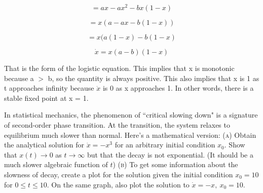 \documentclass[11pt,answers]{exam}
\begin{document}
\begin{questions}
\begin{solution}
$$ = ax - ax^2 - bx(1-x)$$

$$ = x(a-ax-b(1-x))$$

$$ = x(a(1-x)-b(1-x)$$

$$ \dot{x}= x(a-b)(1-x)$$

That is the form of the logistic equation. This implies that x is monotonic because a $>$ b, so the quantity is always positive. This also implies that x is 1 as t approaches infinity because $\dot{x}$ is 0 as x approaches 1. In other words, there is a stable fixed point at x = 1.

\end{solution}

\item In statistical mechanics, the phenomenon of ``critical slowing down" is a signature of second-order phase transition.  At the transition, the system relaxes to equilibrium much slower than normal.  Here's a mathematical version:
\newline\textsc{(a)} Obtain the analytical solution for $\dot{x} = -x^3$ for an arbitrary initial condition $x_0$.  Show that $x(t) \to 0$ as $t \to \infty$ but that the decay is not exponential. (It should be a much slower algebraic function of $t$)
\newline\textsc{(b)} To get some information about the slowness of decay, create a plot for the solution given the initial condition $x_0 = 10$ for $0 \leq t \leq 10$.  On the same graph, also plot the solution to $\dot{x} = -x, ~ x_0 = 10$. 


\end{questions}
\end{document}
